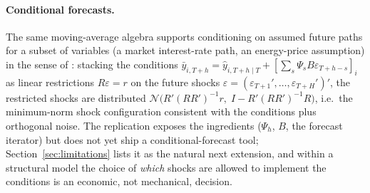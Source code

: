 \paragraph{Conditional forecasts.} The same moving-average algebra supports conditioning on assumed future paths for a subset of variables (a market interest-rate path, an energy-price assumption) in the sense of \citet{waggoner1999}: stacking the conditions $\bar{y}_{i,T+h} = \hat{y}_{i,T+h\mid T} + [\sum_s \Psi_s B \varepsilon_{T+h-s}]_i$ as linear restrictions $R \varepsilon = r$ on the future shocks $\varepsilon = (\varepsilon_{T+1}', \ldots, \varepsilon_{T+H}')'$, the restricted shocks are distributed $\mathcal{N}\big(R'(RR')^{-1} r,\; I - R'(RR')^{-1}R\big)$, i.e.\ the minimum-norm shock configuration consistent with the conditions plus orthogonal noise. The replication exposes the ingredients ($\Psi_h$, $B$, the forecast iterator) but does not yet ship a conditional-forecast tool; Section~\ref{sec:limitations} lists it as the natural next extension, and within a structural model the choice of \emph{which} shocks are allowed to implement the conditions is an economic, not mechanical, decision.
